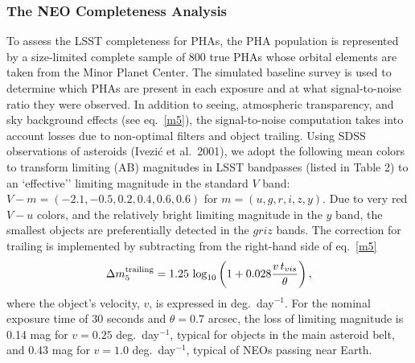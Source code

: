 \subsubsection{   The NEO Completeness Analysis    }
\label{Sec:NEOc}
To assess the LSST completeness for PHAs, the PHA
population is represented by a size-limited complete sample of 800 true
PHAs whose orbital elements are taken from the Minor Planet Center.
The simulated baseline survey is used to determine which PHAs are present in
each exposure and at what signal-to-noise ratio they were observed. In
addition to  seeing, atmospheric transparency, and sky background effects
(see eq.~\ref{m5}), the signal-to-noise computation takes into account losses
due to non-optimal filters and object trailing. Using SDSS observations
of asteroids (Ivezi\'c et al.~2001), we adopt the following mean colors to
transform limiting (AB) magnitudes in LSST bandpasses (listed in Table 2)
to an `effective'' limiting magnitude in the standard $V$ band:
$V-m=(-2.1, -0.5, 0.2, 0.4, 0.6, 0.6)$ for $m=(u,g,r,i,z,y)$. Due to
very red $V-u$ colors, and the relatively bright limiting magnitude in the $y$
band, the smallest objects are preferentially detected in the $griz$ bands.
The correction for trailing is implemented by subtracting from the right-hand
side of eq.~\ref{m5}
\begin{equation}
 \Delta m_5^{\rm trailing} = 1.25\,\log_{10}\left(1+0.028{v \,t_{vis} \over \theta}\right),
\end{equation}
where the object's velocity, $v$, is expressed in deg.~day$^{-1}$. For the nominal
exposure time of 30 seconds and $\theta=0.7$ arcsec, the loss of limiting
magnitude is 0.14 mag for $v=0.25$ deg.~day$^{-1}$, typical for objects in the main
asteroid belt, and 0.43 mag for $v=1.0$ deg.~day$^{-1}$, typical of NEOs passing
near Earth.

